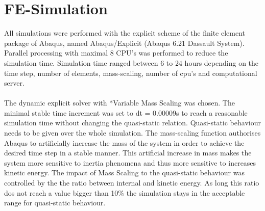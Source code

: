 \documentclass[12pt, a4paper, twoside]{report}
\begin{document}
\section{FE-Simulation}
%
All simulations were performed with the explicit scheme of the finite element package of Abaqus, named Abaqus/Explicit (Abaqus 6.21 Dassault System). Parallel processing with maximal 8 CPU's was performed to reduce the simulation time. Simulation time ranged between 6 to 24 hours depending on the time step, number of elements, mass-scaling, number of cpu's and computational server.\\
\\
The dynamic explicit solver with *Variable Mass Scaling was chosen. The minimal stable time increment was set to dt = 0.00009s to reach a reasonable simulation time without changing the quasi-static relation. Quasi-static behaviour needs to be given over the whole simulation. The mass-scaling function authorises Abaqus to artificially increase the mass of the system in order to achieve the desired time step in a stable manner. This artificial increase in mass makes the system more sensitive to inertia phenomena and thus more sensitive to increases kinetic energy. The impact of Mass Scaling to the quasi-static behaviour was controlled by the the ratio between internal and kinetic energy. As long this ratio dos not reach a value bigger than 10\% the simulation stays in the acceptable range for quasi-static behaviour.\\
%
\end{document}
